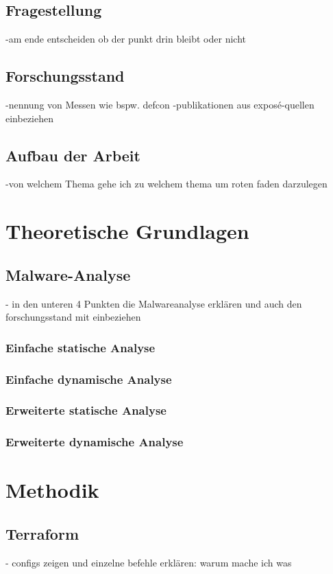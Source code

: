 \documentclass[12pt,oneside]{article}
\begin{document}
\subsection{Fragestellung}
-am ende entscheiden ob der punkt drin bleibt oder nicht
\subsection{Forschungsstand}
-nennung von Messen wie bspw. defcon
\newline
-publikationen aus exposé-quellen einbeziehen
\subsection{Aufbau der Arbeit}
-von welchem Thema gehe ich zu welchem thema um roten faden darzulegen


\section{Theoretische Grundlagen} 





\subsection{Malware-Analyse}
- in den unteren 4 Punkten die Malwareanalyse erklären und auch den forschungsstand mit einbeziehen
\subsubsection{Einfache statische Analyse}
\subsubsection{Einfache dynamische Analyse}
\subsubsection{Erweiterte statische Analyse}
\subsubsection{Erweiterte dynamische Analyse}
\newpage

\section{Methodik}
\subsection{Terraform}\label{Praktisches Terraform}
- configs zeigen und einzelne befehle erklären: warum mache ich was
\end{document}
